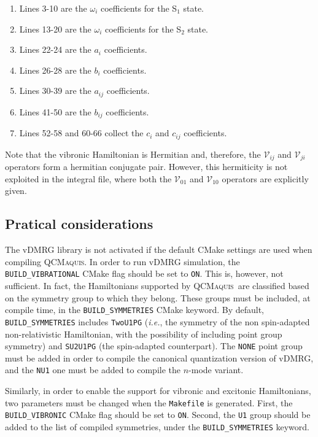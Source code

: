 \documentclass[bibliography=totoc,12pt,a4paper]{scrartcl}
\newcommand{\qcm}{\textsc{QCMaquis}}
\begin{document}
\begin{enumerate}
  \item Lines 3-10 are the $\omega_i$ coefficients for the S$_1$ state.
  \item Lines 13-20 are the $\omega_i$ coefficients for the S$_2$ state.
  \item Lines 22-24 are the $a_i$ coefficients.
  \item Lines 26-28 are the $b_i$ coefficients.
  \item Lines 30-39 are the $a_{ij}$ coefficients.
  \item Lines 41-50 are the $b_{ij}$ coefficients.
  \item Lines 52-58 and 60-66 collect the $c_i$ and $c_{ij}$ coefficients.
\end{enumerate}

Note that the vibronic Hamiltonian is Hermitian and, therefore, the $\mathcal{V}_{ij}$ and $\mathcal{V}_{ji}$ operators form a hermitian conjugate pair.
However, this hermiticity is not exploited in the integral file, where both the $\mathcal{V}_{01}$ and $\mathcal{V}_{10}$ operators are explicitly given.

\subsection{Pratical considerations}
\label{sec:Practical-vDMRG}

The vDMRG library is not activated if the default CMake settings are used when compiling \qcm.
In order to run vDMRG simulation, the \texttt{BUILD\_VIBRATIONAL} CMake flag should be set to \texttt{ON}.
This is, however, not sufficient.
In fact, the Hamiltonians supported by \qcm\ are classified based on the symmetry group to which they belong.
These groups must be included, at compile time, in the \texttt{BUILD\_SYMMETRIES} CMake keyword.
By default, \texttt{BUILD\_SYMMETRIES} includes \texttt{TwoU1PG} (\textit{i.e.}, the symmetry of the non spin-adapted non-relativistic Hamiltonian, with the possibility of including point group symmetry) and \texttt{SU2U1PG} (the spin-adapted counterpart).
The \texttt{NONE} point group must be added in order to compile the canonical quantization version of vDMRG, and the \texttt{NU1} one must be added to compile the $n$-mode variant.

Similarly, in order to enable the support for vibronic and excitonic Hamiltonians, two parameters must be changed when the \texttt{Makefile} is generated.
First, the \texttt{BUILD\_VIBRONIC} CMake flag should be set to \texttt{ON}.
Second, the \texttt{U1} group should be added to the list of compiled symmetries, under the \texttt{BUILD\_SYMMETRIES} keyword.
\end{document}
